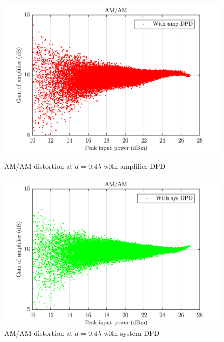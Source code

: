 \begin{figure}[H]
  \centering
  \begin{minipage}[b]{0.5\textwidth}
	\includegraphics[scale = 0.5]{figures/measurement/cree/meas3/amam_amp_dpd_0p4.png}
	\caption{AM/AM distortion at $d = 0.4\lambda$ with amplifier DPD}	
    \label{fig:meas3_amam7}
  \end{minipage}
  \hfill
  \begin{minipage}[b]{0.4\textwidth}
	\includegraphics[scale = 0.5]{figures/measurement/cree/meas3/amam_sys_dpd_0p4.png}
	\caption{AM/AM distortion at $d = 0.4\lambda$ with system DPD}
    \label{fig:meas3_amam8}
  \end{minipage}
\end{figure}

